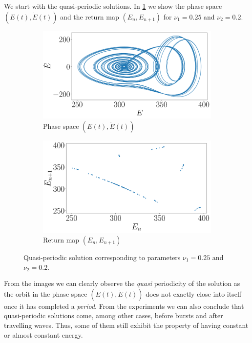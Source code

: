 \documentclass[twoside]{article}
\begin{document}
We start with the quasi-periodic solutions. In \cref{fig:qp} we show the phase space $(E(t), \dot{E}(t))$ and the return map $(E_n,E_{n+1})$ for $\nu_1=0.25$ and $\nu_2=0.2$.

\begin{figure}[ht]
  \centering
  \begin{subfigure}[ht]{0.45\textwidth}
    \includegraphics[width=\textwidth]{images/qp_phase.pdf}
    \caption{Phase space $(E(t), \dot{E}(t))$}
  \end{subfigure}\hfill
  \begin{subfigure}[ht]{0.45\textwidth}
    \includegraphics[width=\textwidth]{images/qp_return.pdf}
    \caption{Return map $(E_n,E_{n+1})$}
  \end{subfigure}
  \caption{Quasi-periodic solution corresponding to parameters $\nu_1=0.25$ and $\nu_2=0.2$.}
  \label{fig:qp}
\end{figure}
From the images we can clearly observe the \emph{quasi} periodicity of the solution as the orbit in the phase space $(E(t), \dot{E}(t))$ does not exactly close into itself once it has completed a \emph{period}. From the experiments we can also conclude that quasi-periodic solutions come, among other cases, before bursts and after travelling waves. Thus, some of them still exhibit the property of having constant or almost constant energy.
\end{document}
